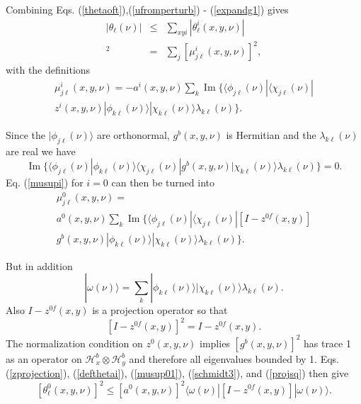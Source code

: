 \documentclass[12pt,amsmath,amssymb,onecolumn]{revtex4-2}
\begin{document}
Combining Eqs. (\ref{thetaoft}),(\ref{ufromperturb}) - (\ref{expandg1}) gives
\begin{subequations}
\begin{eqnarray}
\label{thetasum}
|\theta_\ell(\nu)| &\le& \sum_{xyi}|\theta^i_{\ell}(x,y,\nu)|\\ 
\label{defthetai}
[\theta^i_{\ell}( x,y,\nu)]^2 & = & \sum_j [ \mu^i_{j\ell}(x,y,\nu)]^2,
\end{eqnarray}
\end{subequations}
with the definitions
\begin{multline}
\label{musupi}
\mu^i_{j\ell}(x,y,\nu) =  -a^i(x,y,\nu) \sum_k \operatorname{Im}\{ 
 \langle \phi_{j\ell}(\nu)| \langle \chi_{j\ell}(\nu)| \\
z^i(x,y,\nu)|\phi_{k\ell}(\nu) \rangle |\chi_{k\ell}(\nu) \rangle  \lambda_{k\ell}(\nu)\}.
\end{multline}



Since the  $|\phi_{j\ell}(\nu) \rangle $ are orthonormal,
$g^b(x,y,\nu)$ is Hermitian
and the $\lambda_{k\ell}(\nu)$ are real
we have
\begin{equation}
\label{isup01}
\operatorname{Im}\{
 \langle \phi_{j\ell}(\nu)|\phi_{k\ell}(\nu) \rangle \langle \chi_{j\ell}(\nu)|g^b(x,y,\nu)|\chi_{k\ell}(\nu) \rangle  \lambda_{k\ell}(\nu)\} = 0.
\end{equation}
Eq. (\ref{musupi}) for $i = 0$ can then be turned into
\begin{multline}
\label{musup01}
\mu^0_{j\ell}(x,y,\nu) = \\ a^0(x,y,\nu) \sum_k 
 \operatorname{Im}\{
 \langle \phi_{j\ell}(\nu)| \langle \chi_{j\ell}(\nu)| 
[I - z^{0f}(x,y)] \\g^b(x,y,\nu) 
|\phi_{k\ell}(\nu) \rangle |\chi_{k\ell}(\nu) \rangle  \lambda_{k\ell}(\nu)\}.
\end{multline}



But in addition
\begin{equation}
\label{schmidt3}
|\omega( \nu) \rangle  = \sum_k |\phi_{k\ell}(\nu) \rangle |\chi_{k\ell}(\nu) \rangle  \lambda_{k\ell}(\nu).
\end{equation}
Also $I - z^{0f}(x,y)$ is a projection operator so that
\begin{equation}
\label{projsq}
[I - z^{0f}(x,y)]^2 = I - z^{0f}(x,y).
\end{equation}
The normalization condition on $z^0(x,y,\nu)$ implies 
$[g^b(x,y,\nu)]^2$ has trace 1 as an operator on
$\mathcal{H}^b_x \otimes \mathcal{H}^b_y$
and therefore all eigenvalues bounded by 1.
Eqs. (\ref{zprojection}), (\ref{defthetai}), (\ref{musup01}), (\ref{schmidt3}), and
(\ref{projsq}) then give
\begin{equation}
\label{theta0bound}
[\theta^0_{\ell}(x,y,\nu)]^2 \le [a^0(x,y,\nu)]^2  \langle  \omega(\nu)|[I - z^{0f}(x,y)]|\omega(\nu) \rangle .
\end{equation}
\end{document}
